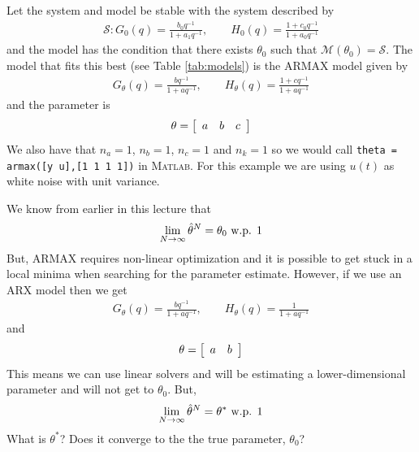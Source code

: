 \begin{example}
\label{ex:convergence}
Let the system and model be stable with the system described by
\begin{align*}
\mathcal{S}: G_0(q) = \frac{b_0q^{-1}}{1+a_1q^{-1}}, \qquad H_0(q)=\frac{1+c_0q^{-1}}{1+a_0q^{-1}}
\end{align*}
and the model has the condition that there exists $\theta_0$ such that $\mathcal{M}(\theta_0) = \mathcal{S}$. The model that fits this best (see Table \ref{tab:models}) is the ARMAX model given by
\begin{align*}
G_\theta(q) = \frac{bq^{-1}}{1+aq^{-1}}, \qquad H_\theta(q)=\frac{1+cq^{-1}}{1+aq^{-1}}
\end{align*}
and the parameter is
$$\theta=\left[\begin{array}{c c c} a & b & c \end{array}\right]$$
We also have that $n_a=1$, $n_b=1$, $n_c=1$ and $n_k=1$ so we would call \texttt{theta = armax([y u],[1 1 1 1])} in \textsc{Matlab}. For this example we are using $u(t)$ as white noise with unit variance.

We know from earlier in this lecture that
$$\lim_{N\to\infty}\hat{\theta}^N = \theta_0 \text{ w.p. } 1$$
But, ARMAX requires non-linear optimization and it is possible to get stuck in a local minima when searching for the parameter estimate. However, if we use an ARX model then we get
\begin{align*}
G_\theta(q) = \frac{bq^{-1}}{1+aq^{-1}}, \qquad H_\theta(q)=\frac{1}{1+aq^{-1}}
\end{align*}
and
$$\theta=\left[\begin{array}{c c} a & b \end{array}\right]$$
This means we can use linear solvers and will be estimating a lower-dimensional parameter and will not get to $\theta_0$. But,
$$\lim_{N\to\infty}\hat{\theta}^N = \theta^\ast \text{ w.p. } 1$$
What is $\theta^\ast$? Does it converge to the the true parameter, $\theta_0$?


\end{example}
